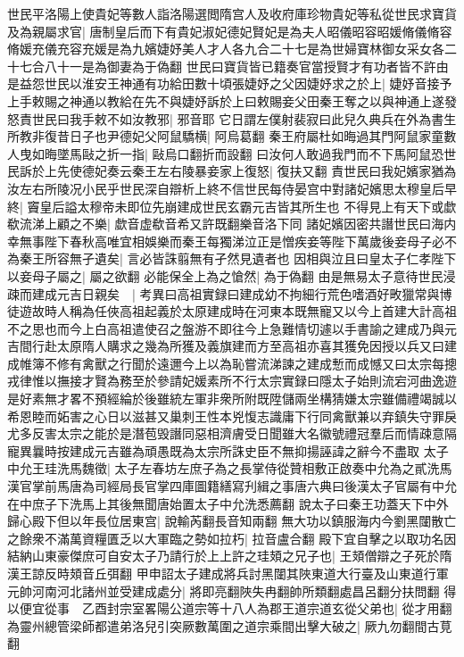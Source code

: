 世民平洛陽上使貴妃等數人詣洛陽選閲隋宫人及收府庫珍物貴妃等私從世民求寶貨及為親屬求官|{
	唐制皇后而下有貴妃淑妃德妃賢妃是為夫人昭儀昭容昭媛脩儀脩容脩媛充儀充容充媛是為九嬪婕妤美人才人各九合二十七是為世婦寶林御女采女各二十七合八十一是為御妻為于偽翻}
世民曰寶貨皆已籍奏官當授賢才有功者皆不許由是益怨世民以淮安王神通有功給田數十頃張婕妤之父因婕妤求之於上|{
	婕妤音接予}
上手敕賜之神通以教給在先不與婕妤訴於上曰敕賜妾父田秦王奪之以與神通上遂發怒責世民曰我手敕不如汝教邪|{
	邪音耶}
它日謂左僕射裴寂曰此兒久典兵在外為書生所教非復昔日子也尹德妃父阿鼠驕横|{
	阿烏葛翻}
秦王府屬杜如晦過其門阿鼠家童數人曳如晦墜馬敺之折一指|{
	敺烏口翻折而設翻}
曰汝何人敢過我門而不下馬阿鼠恐世民訴於上先使德妃奏云秦王左右陵暴妾家上復怒|{
	復扶又翻}
責世民曰我妃嬪家猶為汝左右所陵况小民乎世民深自辯析上終不信世民每侍晏宫中對諸妃嬪思太穆皇后早終|{
	竇皇后謚太穆帝未即位先崩建成世民玄霸元吉皆其所生也}
不得見上有天下或歔欷流涕上顧之不樂|{
	歔音虚欷音希又許既翻樂音洛下同}
諸妃嬪因密共譖世民曰海内幸無事陛下春秋高唯宜相娛樂而秦王每獨涕泣正是憎疾妾等陛下萬歲後妾母子必不為秦王所容無孑遺矣|{
	言必皆誅翦無有孑然見遺者也}
因相與泣且曰皇太子仁孝陛下以妾母子屬之|{
	屬之欲翻}
必能保全上為之愴然|{
	為于偽翻}
由是無易太子意待世民浸疎而建成元吉日親矣　|{
	考異曰高祖實録曰建成幼不拘細行荒色嗜酒好畋獵常與博徒遊故時人稱為任俠高祖起義於太原建成時在河東本既無寵又以今上首建大計高祖不之思也而今上白高祖遣使召之盤游不即往今上急難情切遽以手書諭之建成乃與元吉間行赴太原隋人購求之幾為所獲及義旗建而方至高祖亦喜其獲免因授以兵又曰建成帷簿不修有禽獸之行聞於遠邇今上以為恥嘗流涕諫之建成慙而成憾又曰太宗每摠戎律惟以撫接才賢為務至於參請妃媛素所不行太宗實録曰隱太子始則流宕河曲逸遊是好素無才畧不預經綸於後雖統左軍非衆所附既陞儲兩坐構猜嫌太宗雖備禮竭誠以希恩睦而妬害之心日以滋甚又巢刺王性本兇愎志識庸下行同禽獸兼以弃鎮失守罪戾尤多反害太宗之能於是潛苞毁譖同惡相濟膚受日聞雖大名徽號禮冠羣后而情疎意隔寵異曩時按建成元吉雖為頑愚既為太宗所誅史臣不無抑揚誣諱之辭今不盡取}
太子中允王珪洗馬魏徵|{
	太子左春坊左庶子為之長掌侍從贊相敷正啟奏中允為之貳洗馬漢官掌前馬唐為司經局長官掌四庫圖籍繕寫刋緝之事唐六典曰後漢太子官屬有中允在中庶子下洗馬上其後無聞唐始置太子中允洗悉薦翻}
說太子曰秦王功蓋天下中外歸心殿下但以年長位居東宫|{
	說輸芮翻長音知兩翻}
無大功以鎮服海内今劉黑闥散亡之餘衆不滿萬資糧匱乏以大軍臨之勢如拉朽|{
	拉音盧合翻}
殿下宜自擊之以取功名因結納山東豪傑庶可自安太子乃請行於上上許之珪頍之兄子也|{
	王頍僧辯之子死於隋漢王諒反時頍音丘弭翻}
甲申詔太子建成將兵討黑闥其陜東道大行臺及山東道行軍元帥河南河北諸州並受建成處分|{
	將即亮翻陜失冉翻帥所類翻處昌呂翻分扶問翻}
得以便宜從事　乙酉封宗室畧陽公道宗等十八人為郡王道宗道玄從父弟也|{
	從才用翻}
為靈州總管梁師都遣弟洛兒引突厥數萬圍之道宗乘間出擊大破之|{
	厥九勿翻間古莧翻}
